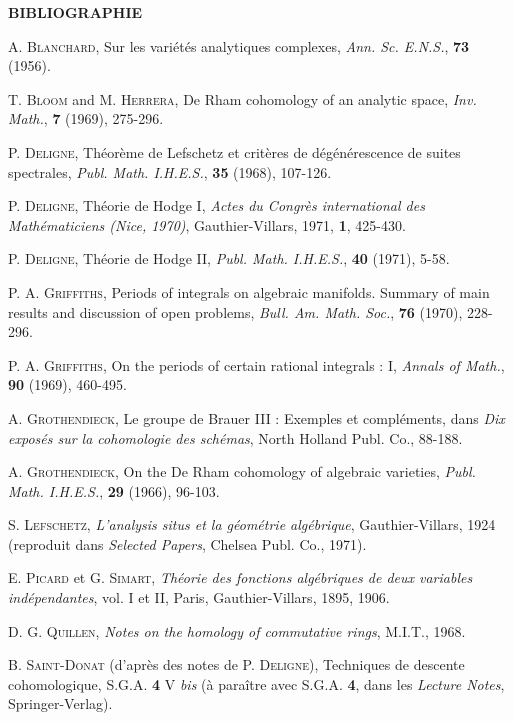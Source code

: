 \documentclass[11pt,leqno]{article}
\begin{document}
{\small
\begin{center}
\textbf{BIBLIOGRAPHIE}
\end{center}

\noindent [1] A. \textsc{Blanchard}, Sur les variétés analytiques complexes, \textit{Ann. Sc. E.N.S.}, \textbf{73} (1956).

\noindent [2] T. \textsc{Bloom} and M. \textsc{Herrera}, De Rham cohomology of an analytic space, \textit{Inv. Math.}, \textbf{7} (1969), 275-296.

\noindent [3] P. \textsc{Deligne}, Théorème de Lefschetz et critères de dégénérescence de suites spectrales, \textit{Publ. Math. I.H.E.S.}, \textbf{35} (1968), 107-126.

\noindent [4] P. \textsc{Deligne}, Théorie de Hodge I, \textit{Actes du Congrès international des Mathématiciens (Nice, 1970)}, Gauthier-Villars, 1971, \textbf{1}, 425-430.

\noindent [5] P. \textsc{Deligne}, Théorie de Hodge II, \textit{Publ. Math. I.H.E.S.}, \textbf{40} (1971), 5-58.

\noindent [6] P. A. \textsc{Griffiths}, Periods of integrals on algebraic manifolds. Summary of main results and discussion of open problems, \textit{Bull. Am. Math. Soc.}, \textbf{76} (1970), 228-296.

\noindent [7] P. A. \textsc{Griffiths}, On the periods of certain rational integrals : I, \textit{Annals of Math.}, \textbf{90} (1969), 460-495.

\noindent [8] A. \textsc{Grothendieck}, Le groupe de Brauer III : Exemples et compléments, dans \textit{Dix exposés sur la cohomologie des schémas}, North Holland Publ. Co., 88-188.

\noindent [9] A. \textsc{Grothendieck}, On the De Rham cohomology of algebraic varieties, \textit{Publ. Math. I.H.E.S.}, \textbf{29} (1966), 96-103.

\noindent [10] S. \textsc{Lefschetz}, \textit{L’analysis situs et la géométrie algébrique}, Gauthier-Villars, 1924 (reproduit dans \textit{Selected Papers}, Chelsea Publ. Co., 1971).

\noindent [11] E. \textsc{Picard} et G. \textsc{Simart}, \textit{Théorie des fonctions algébriques de deux variables indépendantes}, vol. I et II, Paris, Gauthier-Villars, 1895, 1906.

\noindent [12] D. G. \textsc{Quillen}, \textit{Notes on the homology of commutative rings}, M.I.T., 1968.

\noindent [13] B. \textsc{Saint-Donat} (d’après des notes de P. \textsc{Deligne}), Techniques de descente cohomologique, S.G.A. \textbf{4} V \textit{bis} (à paraître avec S.G.A. \textbf{4}, dans les \textit{Lecture Notes}, Springer-Verlag).

}
\end{document}
